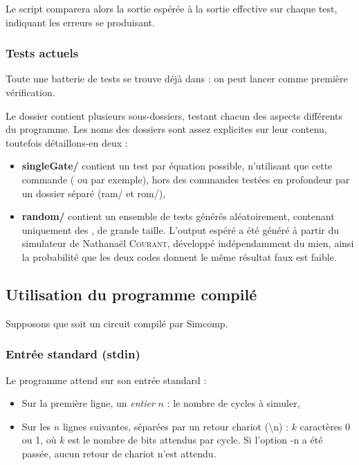 \documentclass[11pt,a4paper]{article}
\begin{document}
Le script comparera alors la sortie espérée à la sortie effective sur chaque test, indiquant les erreurs se produisant.

\subsubsection*{Tests actuels}

Toute une batterie de tests se trouve déjà dans  : on peut lancer  comme première vérification.

Le dossier  contient plusieurs sous-dossiers, testant chacun des aspects différents du programme. Les noms des dossiers sont assez explicites sur leur contenu, toutefois détaillons-en deux :

\begin{itemize}
\item \textbf{singleGate/} contient un test par équation possible, n'utilisant que cette commande ( ou  par exemple), hors des commandes testées en profondeur par un dossier séparé (ram/ et rom/),
\item \textbf{random/} contient un ensemble de tests générés aléatoirement, contenant uniquement des , de grande taille. L'output espéré a été généré à partir du simulateur de Nathanaël \textsc{Courant}, développé indépendamment du mien, ainsi la probabilité que les deux codes donnent le même résultat faux est faible.
\end{itemize}


\subsection{Utilisation du programme compilé} \label{sec:i/o}

Supposons que  soit un circuit compilé par Simcomp.

\subsubsection*{Entrée standard (stdin)}

Le programme attend sur son entrée standard :

\begin{itemize}
\item Sur la première ligne, un \emph{entier} $n$ : le nombre de cycles à simuler,
\item Sur les $n$ lignes suivantes, séparées par un retour chariot (\textbackslash n) : $k$ caractères 0 ou 1, où $k$ est le nombre de bits attendus par cycle. Si l'option -n a été passée, aucun retour de chariot n'est attendu.
\end{itemize}
\end{document}
